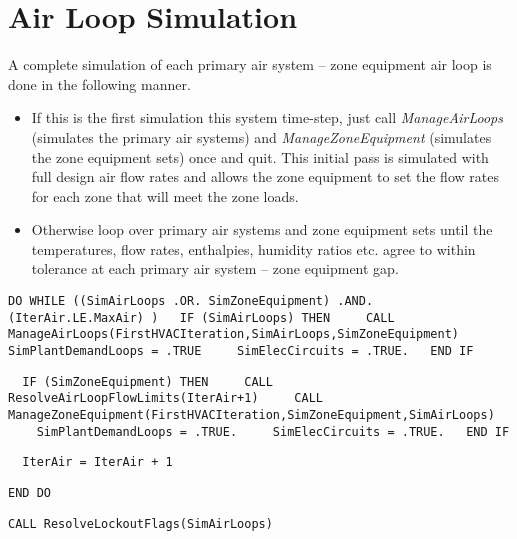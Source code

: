 \section{Air Loop Simulation}\label{air-loop-simulation}

A complete simulation of each primary air system -- zone equipment air loop is done in the following manner.

\begin{itemize}
\item
  If this is the first simulation this system time-step, just call \emph{ManageAirLoops} (simulates the primary air systems) and \emph{ManageZoneEquipment} (simulates the zone equipment sets) once and quit. This initial pass is simulated with full design air flow rates and allows the zone equipment to set the flow rates for each zone that will meet the zone loads.
\item
  Otherwise loop over primary air systems and zone equipment sets until the temperatures, flow rates, enthalpies, humidity ratios etc. agree to within tolerance at each primary air system -- zone equipment gap. 
\end{itemize}

\begin{lstlisting}
DO WHILE ((SimAirLoops .OR. SimZoneEquipment) .AND. (IterAir.LE.MaxAir) )   IF (SimAirLoops) THEN     CALL ManageAirLoops(FirstHVACIteration,SimAirLoops,SimZoneEquipment)     SimPlantDemandLoops = .TRUE     SimElecCircuits = .TRUE.   END IF
\end{lstlisting}

\begin{lstlisting}
  IF (SimZoneEquipment) THEN     CALL ResolveAirLoopFlowLimits(IterAir+1)     CALL ManageZoneEquipment(FirstHVACIteration,SimZoneEquipment,SimAirLoops)     SimPlantDemandLoops = .TRUE.     SimElecCircuits = .TRUE.   END IF
\end{lstlisting}

\begin{lstlisting}
  IterAir = IterAir + 1
\end{lstlisting}

\begin{lstlisting}
END DO
\end{lstlisting}

\begin{lstlisting}
CALL ResolveLockoutFlags(SimAirLoops)
\end{lstlisting}


